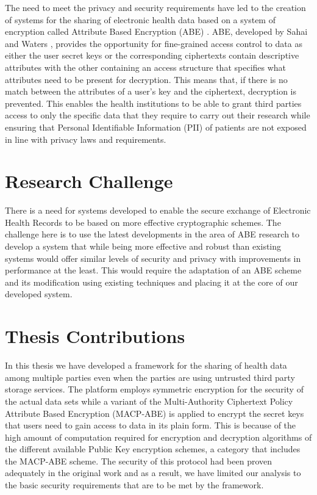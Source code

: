 The need to meet the privacy and security requirements have led to the creation of systems for the sharing of electronic health data based on a system of encryption called Attribute Based Encryption (ABE) \cite{Ibraimi2010}\cite{Narayan2010}\cite{Akinyele2010}\cite{Barua2011}\cite{Alshehri}\cite{Hupperich2012}\cite{Hsieh2012}\cite{Li2013}. ABE, developed by Sahai and Waters \cite{Sahai2005}, provides the opportunity for fine-grained access control to data as either the user secret keys or the corresponding ciphertexts contain descriptive attributes with the other containing an access structure that specifies what attributes need to be present for decryption. This means that, if there is no match between the attributes of a user's key and the ciphertext, decryption is prevented. This enables the health institutions to be able to grant third parties access to only the specific data that they require to carry out their research while ensuring that Personal Identifiable Information (PII) of patients are not exposed in line with privacy laws and requirements.

\section{Research Challenge}

There is a need for systems developed to enable the secure exchange of Electronic Health Records to be based on more effective cryptographic schemes.  The challenge here is to use the latest developments in the area of ABE research to develop a system that while being more effective and robust than existing systems would offer similar levels of security and privacy with improvements in performance at the least. This would require the adaptation of an ABE scheme and its modification using existing techniques and placing it at the core of our developed system.

\section{Thesis Contributions}

In this thesis we have developed a framework for the sharing of health data among multiple parties even when the parties are using untrusted third party storage services. The platform employs symmetric encryption for the security of the actual data sets while a variant of the Multi-Authority Ciphertext Policy Attribute Based Encryption (MACP-ABE) is applied to encrypt the secret keys that users need to gain access to data in its plain form. This is because of the high amount of computation required for encryption and decryption algorithms of the different available Public Key encryption schemes, a category that includes the MACP-ABE scheme. The security of this protocol had been proven adequately in the original work \cite{Yang2014} and as a result, we have limited our analysis to the basic security requirements that are to be met by the framework.

